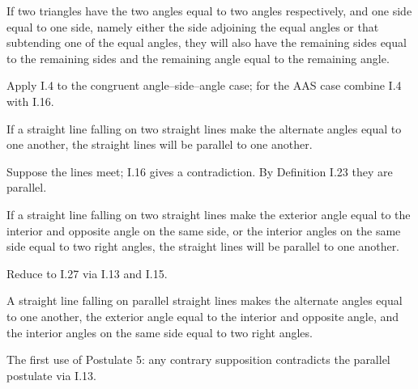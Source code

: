 \documentclass{rrxiv}
\begin{document}
\begin{claim}
\label{prop:I.26}
If two triangles have the two angles equal to two angles respectively,
and one side equal to one side, namely either the side adjoining the
equal angles or that subtending one of the equal angles, they will
also have the remaining sides equal to the remaining sides and the
remaining angle equal to the remaining angle.
\end{claim}
\begin{evidence}[Proof of I.26]
\label{ev:I.26}
Apply I.4 to the congruent angle--side--angle case; for the AAS case
combine I.4 with I.16.
\end{evidence}

\begin{claim}
\label{prop:I.27}
If a straight line falling on two straight lines make the alternate
angles equal to one another, the straight lines will be parallel to
one another.
\end{claim}
\begin{evidence}[Proof of I.27]
\label{ev:I.27}
Suppose the lines meet; I.16 gives a contradiction.  By Definition
I.23 they are parallel.
\end{evidence}

\begin{claim}
\label{prop:I.28}
If a straight line falling on two straight lines make the exterior
angle equal to the interior and opposite angle on the same side, or
the interior angles on the same side equal to two right angles, the
straight lines will be parallel to one another.
\end{claim}
\begin{evidence}[Proof of I.28]
\label{ev:I.28}
Reduce to I.27 via I.13 and I.15.
\end{evidence}

\begin{claim}
\label{prop:I.29}
A straight line falling on parallel straight lines makes the alternate
angles equal to one another, the exterior angle equal to the interior
and opposite angle, and the interior angles on the same side equal to
two right angles.
\end{claim}
\begin{evidence}[Proof of I.29]
\label{ev:I.29}
The first use of Postulate 5: any contrary supposition contradicts the
parallel postulate via I.13.
\end{evidence}
\end{document}
